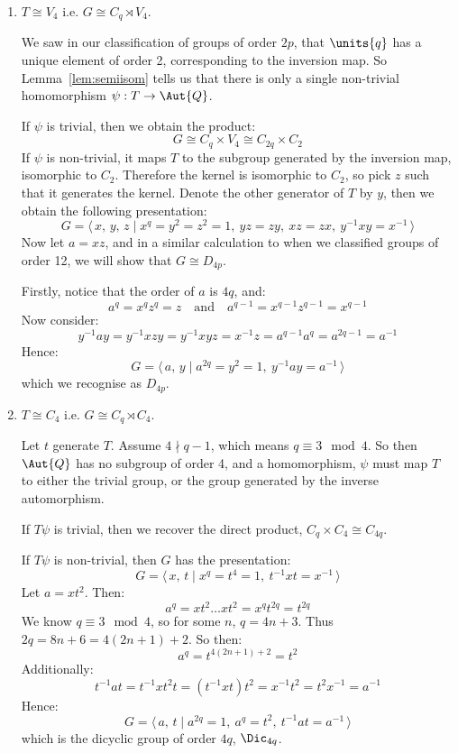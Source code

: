\begin{enumerate}
    \item \(T \cong V_4\) i.e. \(G \cong C_q \rtimes V_4\).

    We saw in our classification of groups of order \(2p\), that \(\units{q}\) has a unique element of order 2,
    corresponding to the inversion map.
    So Lemma~\ref{lem:semiisom} tells us that there is only a single non-trivial homomorphism \(\psi:T \to \Aut{Q}\).

    If \(\psi\) is trivial, then we obtain the product:
    \[G \cong C_q \times V_4 \cong C_{2q} \times C_2\]
    If \(\psi\) is non-trivial, it maps \(T\) to the subgroup generated by the inversion map, isomorphic to \(C_2\).
    Therefore the kernel is isomorphic to \(C_2\), so pick \(z\) such that it generates the kernel.
    Denote the other generator of \(T\) by \(y\), then we obtain the following presentation:
    \[G = \langle\, x,\,y,\,z \mid x^q = y^2 = z^2 = 1,\ yz = zy,\ xz = zx,\ y^{-1}xy = x^{-1}\,\rangle\]
    Now let \(a = xz\), and in a similar calculation to when we classified groups of order 12, we will show that \(G
    \cong D_{4p}\).

    Firstly, notice that the order of \(a\) is \(4q\), and:
    \[a^q = x^q z^q = z \quad \text{and} \quad a^{q-1} = x^{q-1} z^{q-1} = x^{q-1}\]
    Now consider:
    \[y^{-1}ay = y^{-1}xzy = y^{-1}xyz = x^{-1}z = a^{q-1} a^q = a^{2q-1} = a^{-1}\]
    Hence:
    \[G = \langle\, a,\,y \mid a^{2q} = y^2 = 1,\ y^{-1}ay = a^{-1}\,\rangle\]
    which we recognise as \(D_{4p}\).

    \item \(T \cong C_4\) i.e. \(G \cong C_q \rtimes C_4\).

        Let \(t\) generate \(T\).
        Assume \(4 \nmid q-1\), which means \(q \equiv 3 \mod{4}\).
        So then \(\Aut{Q}\) has no subgroup of order 4, and a homomorphism, \(\psi\) must map \(T\) to either the
        trivial group, or the group generated by the inverse automorphism.

        If \(T\psi\) is trivial, then we recover the direct product, \(C_q \times C_4 \cong C_{4q}\).

        If \(T\psi\) is non-trivial, then \(G\) has the presentation:
        \[G = \langle\, x,\,t \mid x^q = t^4 = 1,\ t^{-1}xt = x^{-1}\,\rangle\]
        Let \(a = xt^2\).
        Then:
        \[a^q = xt^2\dots xt^2 = x^q t^{2q} = t^{2q}\]
        We know \(q \equiv 3 \mod{4}\), so for some \(n\), \(q = 4n + 3\).
        Thus \(2q = 8n + 6 = 4(2n + 1) + 2\).
        So then:
        \[a^q = t^{4(2n + 1) + 2} = t^2\]
        Additionally:
        \[t^{-1}at = t^{-1}xt^2t = (t^{-1}xt)t^2 = x^{-1}t^2 = t^2 x^{-1} = a^{-1}\]
        Hence:
        \[G = \langle\, a,\,t \mid a^{2q} = 1,\ a^q = t^2,\ t^{-1}at = a^{-1}\,\rangle\]
        which is the dicyclic group of order \(4q\), \(\Dic_{4q}\).


\end{enumerate}
